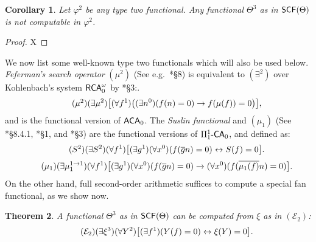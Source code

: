 \documentclass[reqno]{amsart}
\newtheorem{thm}{Theorem}
\newtheorem{cor}[thm]{Corollary}
\newcommand\be{\begin{equation}}
\newcommand\ee{\end{equation}}
\def\FIVE{\Pi_{1}^{1}\text{-\textsf{CA}}_{0}}
\def\RCAo{\textup{\textsf{RCA}}_{0}^{\omega}}
\def\di{\rightarrow}
\def\asa{\leftrightarrow}
\def\ACA{\textup{\textsf{ACA}}}
\def\SCF{\textup{\textsf{SCF}}}
\numberwithin{equation}{section}
\numberwithin{thm}{section}
\begin{document}
\begin{cor}\label{import2}
Let $\varphi^{2}$ be any type two functional.   
Any functional $\Theta^{3}$ as in $\SCF(\Theta)$ is not computable in $\varphi^{2}$.   
\end{cor}
\begin{proof}
X
\end{proof}
We now list some well-known type two functionals which will also be used below.  
\emph{Feferman's search operator} $(\mu^{2})$ (See e.g.\ \cite{avi2}*{\S8}) is equivalent to $(\exists^{2})$ over Kohlenbach's system $\RCAo$ by \cite{kooltje}*{\S3}:.
\be\tag{$\mu^{2}$}
(\exists \mu^{2})\big[(\forall f^{1})\big( (\exists n^{0})(f(n)=0)\di f(\mu(f))=0   \big)  \big],
\ee
and is the functional version of $\ACA_{0}$.  The \emph{Suslin functional} and $(\mu_{1})$ (See \cite{avi1}*{\S8.4.1}, \cite{kohlenbach2}*{\S1}, and \cite{yamayamaharehare}*{\S3}) are the functional versions of $\FIVE$, and defined as: 
\be\tag{$S^{2}$}
(\exists S^{2})(\forall f^{1})\big[  (\exists g^{1})(\forall x^{0})(f(\overline{g}n)=0)\asa S(f)=0  \big].
\ee
\be\tag{$\mu_{1}$}
(\exists \mu_{1}^{1\di 1})(\forall f^{1})\big[  (\exists g^{1})(\forall x^{0})(f(\overline{g}n)=0)\di (\forall x^{0})(f(\overline{\mu_{1}(f)}n)=0)  \big].
\ee
%
%
On the other hand, full second-order arithmetic suffices to compute a special fan functional, as we show now.
\begin{thm}\label{import3}
A functional $\Theta^{3}$ as in $\SCF(\Theta)$ can be computed from $\xi$ as in $(\mathcal{E}_{2})$: %
\be\tag{$\mathcal{E}_{2}$}\label{hah}
(\exists \xi^{3})(\forall Y^{2})\big[  (\exists f^{1})(Y(f)=0)\asa \xi(Y)=0  \big].
\ee
\end{thm}
\end{document}
